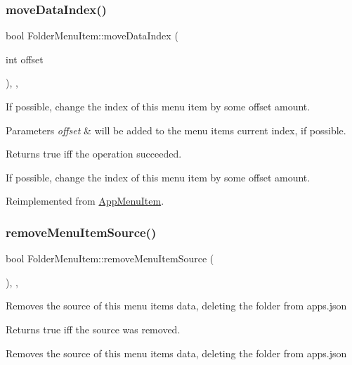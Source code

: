 \subsubsection{\texorpdfstring{move\+Data\+Index()}{moveDataIndex()}}
{\footnotesize\ttfamily bool Folder\+Menu\+Item\+::move\+Data\+Index (\begin{DoxyParamCaption}\item[{int}]{offset }\end{DoxyParamCaption})\hspace{0.3cm}{\ttfamily [override]}, {\ttfamily [protected]}, {\ttfamily [virtual]}}

If possible, change the index of this menu item by some offset amount. 
\begin{DoxyParams}{Parameters}
{\em offset} & will be added to the menu item\textquotesingle{}s current index, if possible. \\
\hline
\end{DoxyParams}
\begin{DoxyReturn}{Returns}
true iff the operation succeeded.
\end{DoxyReturn}
If possible, change the index of this menu item by some offset amount. 

Reimplemented from \mbox{\hyperlink{classAppMenuItem_a66b922c9168e1df29f61ca6e98726d16}{App\+Menu\+Item}}.

\mbox{\label{classFolderMenuItem_a0cddd7f7e2ac8f27e93861f058ca5094}} 
\subsubsection{\texorpdfstring{remove\+Menu\+Item\+Source()}{removeMenuItemSource()}}
{\footnotesize\ttfamily bool Folder\+Menu\+Item\+::remove\+Menu\+Item\+Source (\begin{DoxyParamCaption}{ }\end{DoxyParamCaption})\hspace{0.3cm}{\ttfamily [override]}, {\ttfamily [protected]}, {\ttfamily [virtual]}}

Removes the source of this menu item\textquotesingle{}s data, deleting the folder from apps.\+json

\begin{DoxyReturn}{Returns}
true iff the source was removed.
\end{DoxyReturn}
Removes the source of this menu item\textquotesingle{}s data, deleting the folder from apps.\+json 

